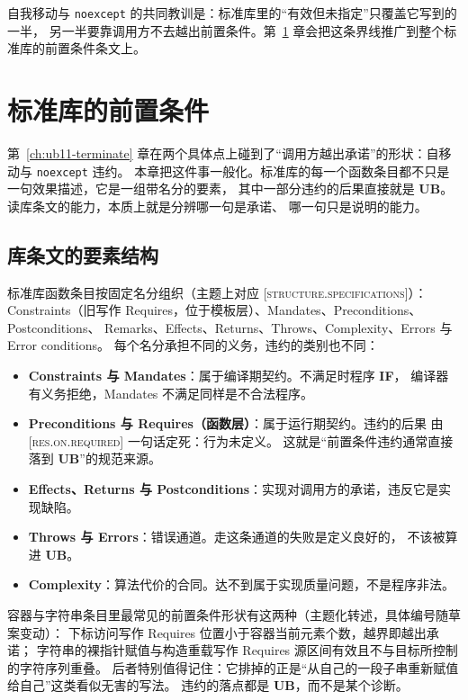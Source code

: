 \documentclass[12pt,a4paper,fontset=fandol]{ctexbook}
\newcommand{\Tp}[1]{\texttt{#1}}
\newcommand{\UB}{\textbf{\textsf{UB}}}
\newcommand{\ILLF}{\textbf{\textsf{IF}}}
\newcommand{\Std}[1]{\textsc{[#1]}}
\begin{document}
\begin{guideline}[title={本章的一句话结论}]
自我移动与 \Tp{noexcept} 的共同教训是：标准库里的“有效但未指定”只覆盖它写到的一半，
另一半要靠调用方不去越出前置条件。第~\ref{ch:ub12-library-pre} 章会把这条界线推广到整个标准库的前置条件条文上。
\end{guideline}

\chapter{标准库的前置条件}\label{ch:ub12-library-pre}

第~\ref{ch:ub11-terminate} 章在两个具体点上碰到了“调用方越出承诺”的形状：自移动与 \Tp{noexcept} 违约。
本章把这件事一般化。标准库的每一个函数条目都不只是一句效果描述，它是一组带名分的要素，
其中一部分违约的后果直接就是 \UB{}。读库条文的能力，本质上就是分辨哪一句是承诺、
哪一句只是说明的能力。

\section{库条文的要素结构}\label{sec:ub12-elements}

标准库函数条目按固定名分组织（主题上对应 \Std{structure.specifications}）：
Constraints（旧写作 Requires，位于模板层）、Mandates、Preconditions、Postconditions、
Remarks、Effects、Returns、Throws、Complexity、Errors 与 Error conditions。
每个名分承担不同的义务，违约的类别也不同：

\begin{itemize}
  \item \textbf{Constraints 与 Mandates}：属于编译期契约。不满足时程序 \ILLF{}，
        编译器有义务拒绝，Mandates 不满足同样是不合法程序。
  \item \textbf{Preconditions 与 Requires（函数层）}：属于运行期契约。违约的后果
        由 \Std{res.on.required} 一句话定死：行为未定义。
        这就是“前置条件违约通常直接落到 \UB{}”的规范来源。
  \item \textbf{Effects、Returns 与 Postconditions}：实现对调用方的承诺，违反它是实现缺陷。
  \item \textbf{Throws 与 Errors}：错误通道。走这条通道的失败是定义良好的，
        不该被算进 \UB{}。
  \item \textbf{Complexity}：算法代价的合同。达不到属于实现质量问题，不是程序非法。
\end{itemize}

\begin{clause}[title={两个典型措辞样例}]
容器与字符串条目里最常见的前置条件形状有这两种（主题化转述，具体编号随草案变动）：
下标访问写作 Requires 位置小于容器当前元素个数，越界即越出承诺；
字符串的裸指针赋值与构造重载写作 Requires 源区间有效且不与目标所控制的字符序列重叠。
后者特别值得记住：它排掉的正是“从自己的一段子串重新赋值给自己”这类看似无害的写法。
违约的落点都是 \UB{}，而不是某个诊断。
\end{clause}
\end{document}
